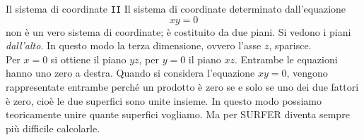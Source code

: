 \begin{surferPage}[Coordinate II]{Il sistema di coordinate {\tt II}}
Il sistema di coordinate determinato dall'equazione
\[xy=0\]
non \`e un vero sistema di coordinate; \`e costituito da due piani. Si vedono i piani {\it dall'alto}. In questo modo la terza dimensione, ovvero l'asse $z$, sparisce.\\
Per $x=0$ si ottiene il piano $yz$, per $y=0$ il piano $xz$.
Entrambe le equazioni hanno uno zero a destra. Quando si considera l'equazione $xy=0$, vengono rappresentate entrambe perch\'e un prodotto \`e zero se e solo se uno dei due fattori \`e zero, cio\`e le due superfici sono unite insieme. In questo modo possiamo teoricamente unire quante superfici vogliamo. Ma per SURFER diventa sempre pi\`u difficile calcolarle.
\end{surferPage}

